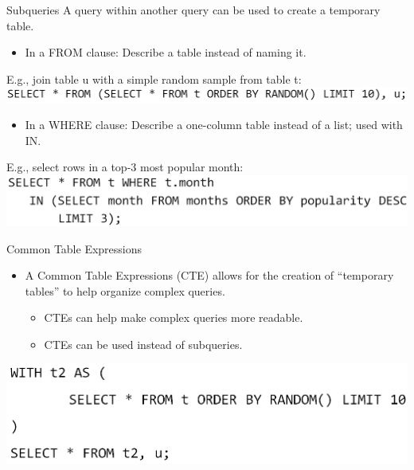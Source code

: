 \documentclass[aspectratio=169]{../latex_main/tntbeamer}  %
\begin{document}
	
	
	\begin{frame}{Subqueries}
	    A query within another query can be used to create a temporary table.
	    \begin{itemize}
	        \item In a FROM clause: Describe a table instead of naming it.
	    \end{itemize}
	    E.g., join table u with a simple random sample from table t:\\
	    \hspace{.5cm} \includegraphics[scale=.4]{Bild35}
	    \bigskip
	    \begin{itemize}
	        \item In a WHERE clause: Describe a one-column table instead of a list; used with IN.
	    \end{itemize}
	    E.g., select rows in a top-3 most popular month:\\
	    \hspace{.5cm}
	    \includegraphics[scale=.4]{Bild36}
	\end{frame}
	
	
	\begin{frame}{Common Table Expressions}
	    \begin{itemize}
	        \item A Common Table Expressions (CTE) allows for the creation of “temporary tables” to help organize complex queries.
	        \begin{itemize}
	            \item CTEs can help make complex queries more readable.
	            \item CTEs can be used instead of subqueries.
	        \end{itemize}
	    \end{itemize}
	    \bigskip
	    \includegraphics[scale=.4]{Bild37}
	\end{frame}
	
\end{document}
